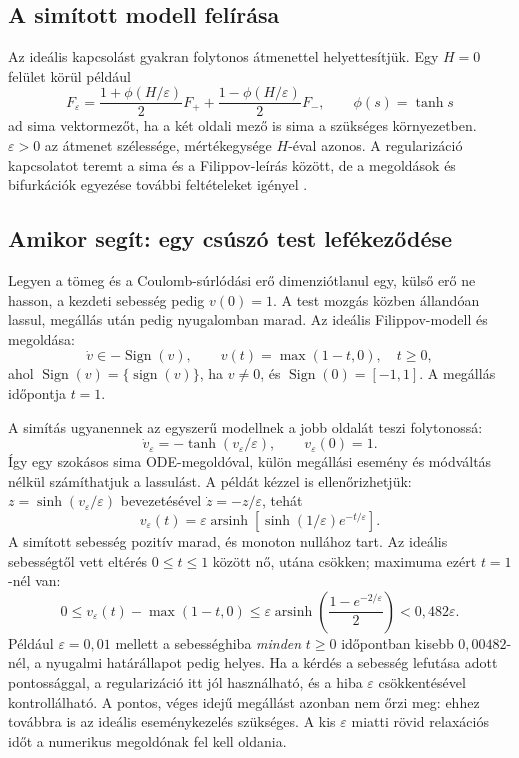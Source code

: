 \subsection{A simított modell felírása}
Az ideális kapcsolást gyakran folytonos átmenettel helyettesítjük. Egy $H=0$ felület körül például
\begin{equation}
F_\varepsilon=\frac{1+\phi(H/\varepsilon)}2F_+
+\frac{1-\phi(H/\varepsilon)}2F_-,\qquad \phi(s)=\tanh s
\end{equation}
ad sima vektormezőt, ha a két oldali mező is sima a szükséges környezetben. $\varepsilon>0$ az átmenet szélessége, mértékegysége $H$-éval azonos. A regularizáció kapcsolatot teremt a sima és a Filippov-leírás között, de a megoldások és bifurkációk egyezése további feltételeket igényel \cite{sotomayor_teixeira}.

\subsection{Amikor segít: egy csúszó test lefékeződése}
\examplebody

Legyen a tömeg és a Coulomb-súrlódási erő dimenziótlanul egy, külső erő ne hasson, a kezdeti sebesség pedig $v(0)=1$. A test mozgás közben állandóan lassul, megállás után pedig nyugalomban marad. Az ideális Filippov-modell és megoldása:
\[
\dot v\in-\operatorname{Sign}(v),\qquad
v(t)=\max(1-t,0),\quad t\geq0,
\]
ahol $\operatorname{Sign}(v)=\{\operatorname{sign}(v)\}$, ha $v\neq0$, és $\operatorname{Sign}(0)=[-1,1]$. A megállás időpontja $t=1$.

A simítás ugyanennek az egyszerű modellnek a jobb oldalát teszi folytonossá:
\[
\dot v_\varepsilon=-\tanh(v_\varepsilon/\varepsilon),\qquad
v_\varepsilon(0)=1.
\]
Így egy szokásos sima ODE-megoldóval, külön megállási esemény és módváltás nélkül számíthatjuk a lassulást. A példát kézzel is ellenőrizhetjük: $z=\sinh(v_\varepsilon/\varepsilon)$ bevezetésével $\dot z=-z/\varepsilon$, tehát
\begin{equation}\label{eq:regularization_braking_exact}
v_\varepsilon(t)=\varepsilon\operatorname{arsinh}
\left[\sinh(1/\varepsilon)e^{-t/\varepsilon}\right].
\end{equation}
A simított sebesség pozitív marad, és monoton nullához tart. Az ideális sebességtől vett eltérés $0\leq t\leq1$ között nő, utána csökken; maximuma ezért $t=1$-nél van:
\[
0\leq v_\varepsilon(t)-\max(1-t,0)
\leq\varepsilon\operatorname{arsinh}\!\left(\frac{1-e^{-2/\varepsilon}}2\right)
<0{,}482\varepsilon.
\]
Például $\varepsilon=0{,}01$ mellett a sebességhiba \emph{minden} $t\geq0$ időpontban kisebb $0{,}00482$-nél, a nyugalmi határállapot pedig helyes. Ha a kérdés a sebesség lefutása adott pontossággal, a regularizáció itt jól használható, és a hiba $\varepsilon$ csökkentésével kontrollálható. A pontos, véges idejű megállást azonban nem őrzi meg: ehhez továbbra is az ideális eseménykezelés szükséges. A kis $\varepsilon$ miatti rövid relaxációs időt a numerikus megoldónak fel kell oldania.

